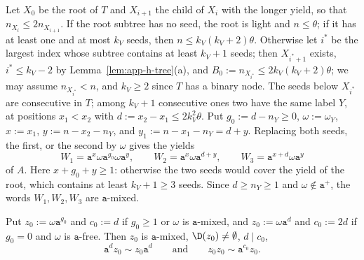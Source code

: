 Let $X_0$ be the root of $T$ and $X_{i+1}$ the child of $X_i$ with the longer
yield, so that $n_{X_i}\le2n_{X_{i+1}}$.  If the root subtree has no seed, the
root is light and $n\le\theta$; if it has at least one and at most $k_V$ seeds,
then $n\le k_V(k_V+2)\theta$.  Otherwise let $i^*$ be the largest index
whose subtree contains at least $k_V+1$ seeds; then $X_{i^*+1}$ exists,
$i^*\le k_V-2$ by Lemma~\ref{lem:app-h-tree}(a), and
$B_0:=n_{X_{i^*}}\le2k_V(k_V+2)\theta$; we may assume $n_{X_{i^*}}<n$, and
$k_V\ge2$ since $T$ has a binary node.  The seeds below $X_{i^*}$ are
consecutive in $T$; among $k_V+1$ consecutive ones two have the same label $Y$,
at positions $x_1<x_2$ with $d:=x_2-x_1\le2k_V^2\theta$.  Put $g_0:=d-n_Y\ge0$,
$\omega:=\omega_Y$, $x:=x_1$, $y:=n-x_2-n_Y$, and $y_1:=n-x_1-n_Y=d+y$.
Replacing both seeds, the first, or the second by $\omega$ gives the yields
\[
 W_1=\mathtt a^x\omega\mathtt a^{g_0}\omega\mathtt a^y,\qquad
 W_2=\mathtt a^x\omega\mathtt a^{d+y},\qquad
 W_3=\mathtt a^{x+d}\omega\mathtt a^y
\]
of $A$.  Here $x+g_0+y\ge1$: otherwise the two seeds would cover the yield of
the root, which contains at least $k_V+1\ge3$ seeds.  Since $d\ge n_Y\ge1$ and
$\omega\notin\mathtt a^+$, the words $W_1,W_2,W_3$ are $\mathtt a$-mixed.

\begin{lemma}[Base]
\label{lem:app-h-base}
Put $z_0:=\omega\mathtt a^{g_0}$ and $c_0:=d$ if $g_0\ge1$ or $\omega$ is
$\mathtt a$-mixed, and $z_0:=\omega\mathtt a^d$ and $c_0:=2d$ if $g_0=0$ and $\omega$
is $\mathtt a$-free.  Then $z_0$ is $\mathtt a$-mixed, $\D(z_0)\ne\emptyset$,
$d\mid c_0$,
\[
 \mathtt a^dz_0\sim z_0\mathtt a^d\qquad\text{and}\qquad z_0z_0\sim\mathtt a^{c_0}z_0.
\]
\end{lemma}

